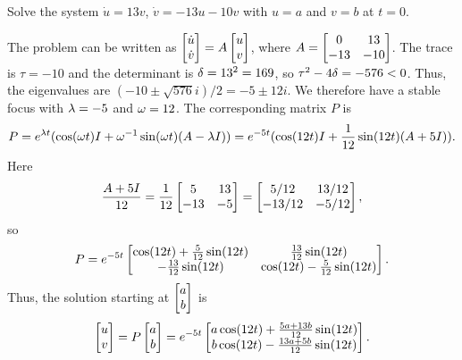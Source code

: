 \documentclass[a4paper]{amsart}
\begin{document}
\begin{exercise}\label{ex-linear-a}
 Solve the system $\dot{u}=13v$, $\dot{v}=-13u-10v$ with
 $u=a$ and $v=b$ at $t=0$.
\end{exercise}
\begin{solution}
 The problem can be written as
 $\left[\begin{matrix}\dot{u}\\ \dot{v}\end{matrix}\right]=A\left[\begin{matrix} u\\ v\end{matrix}\right]$, where 
 $A=\left[\begin{matrix} 0 & 13 \\ -13 & -10\end{matrix}\right]$.  The trace is $\tau=-10$ and the
 determinant is $\delta=13^2=169$, so $\tau^2-4\delta=-576<0$.  Thus, the
 eigenvalues are $(-10\pm\sqrt{576}i)/2=-5\pm 12i$.  We therefore have
 a stable focus with $\lambda=-5$ and $\omega=12$.  The corresponding matrix
 $P$ is
 \[ P = e^{\lambda t}(\cos(\omega t)I+\omega^{-1}\sin(\omega t)(A-\lambda I))
      = e^{-5t}(\cos(12t)I+\frac{1}{12}\sin(12t)(A+5I)).
 \]
 Here 
 \[ \frac{A+5I}{12} = 
     \frac{1}{12}\left[\begin{matrix} 5 & 13 \\ -13 & -5 \end{matrix}\right] = 
      \left[\begin{matrix} 5/12 & 13/12 \\ -13/12 & -5/12 \end{matrix}\right], 
 \]
 so 
 \[ P = e^{-5t}\left[\begin{matrix} \cos(12t)+\frac{5}{12}\sin(12t) & 
                    \frac{13}{12}\sin(12t) \\
                    -\frac{13}{12}\sin(12t) &
                    \cos(12t)-\frac{5}{12}\sin(12t) \end{matrix}\right].
 \]
 Thus, the solution starting at $\left[\begin{matrix} a\\ b\end{matrix}\right]$ is
 \[ \left[\begin{matrix} u\\ v \end{matrix}\right] = P\left[\begin{matrix} a\\ b\end{matrix}\right] =
      e^{-5t} \left[\begin{matrix} a\cos(12t) + \frac{5a+13b}{12}\sin(12t) \\
                   b\cos(12t) - \frac{13a+5b}{12}\sin(12t) \end{matrix}\right].
 \]
\end{solution}
\end{document}
